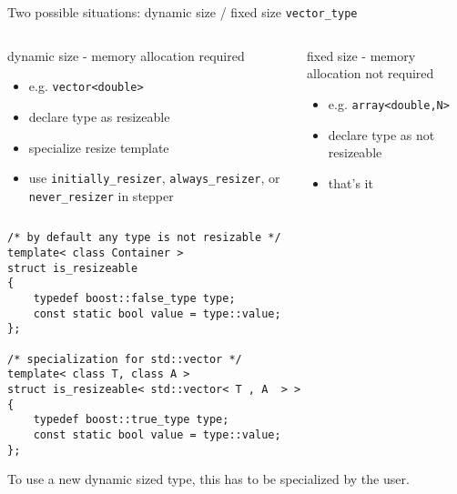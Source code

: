 \begin{frame}[fragile]
Two possible situations: dynamic size / fixed size \lstinline+vector_type+
\vspace{0.5em}

\begin{columns}[t]

 \begin{column}{0.5\linewidth}
  \begin{block}{dynamic size - memory allocation required}
   \begin{itemize}
    \item e.g. \lstinline+vector<double>+
    \item declare type as resizeable
    \item specialize resize template
    \item use \lstinline+initially_resizer+, \lstinline+always_resizer+, or \lstinline+never_resizer+ in stepper
   \end{itemize}
  \end{block}
 \end{column}

 \begin{column}{0.5\linewidth}
  \begin{block}{fixed size - memory allocation not required}
   \begin{itemize}
    \item e.g. \lstinline+array<double,N>+
    \item declare type as not resizeable
    \item that's it
   \end{itemize}
  \end{block}
 \end{column}

\end{columns}

\end{frame}

\begin{frame}[fragile]

\begin{lstlisting}
/* by default any type is not resizable */
template< class Container >
struct is_resizeable
{
    typedef boost::false_type type;
    const static bool value = type::value;
};

/* specialization for std::vector */
template< class T, class A >
struct is_resizeable< std::vector< T , A  > >
{
    typedef boost::true_type type;
    const static bool value = type::value;
}; 
\end{lstlisting}
To use a new dynamic sized type, this has to be specialized by the user.
\end{frame}


